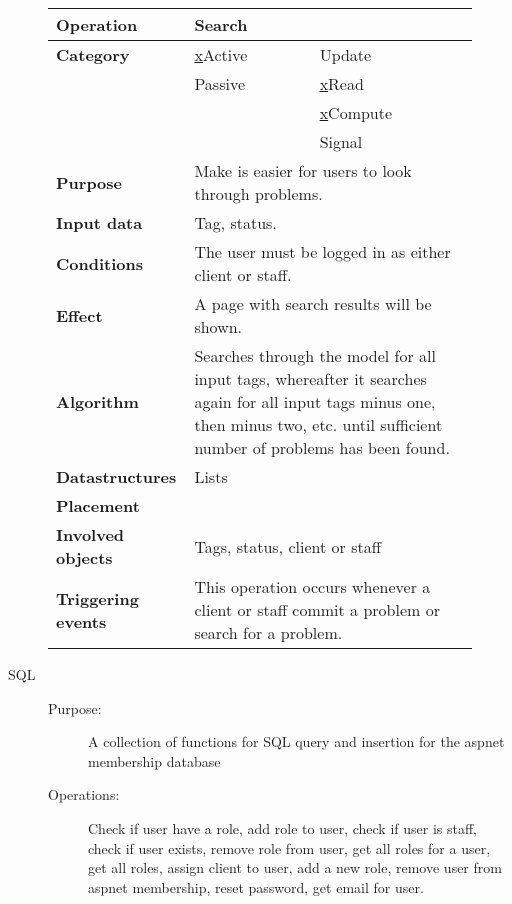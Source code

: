 \begin{figure}
\begin{tabular}{p{3.5cm} p{4cm} p{4cm}}
\hline
\textbf{Operation}&Search\\
\hline
\textbf{Category}&\underline{x}Active&\underline{ }Update\\
&\underline{ }Passive&\underline{x}Read\\
&&\underline{x}Compute\\
&&\underline{ }Signal\\
\textbf{Purpose}&\multicolumn{2}{p{8cm}}{Make is easier for users to look through problems.}\\
\textbf{Input data}&\multicolumn{2}{p{8cm}}{Tag, status.}\\
\textbf{Conditions}&\multicolumn{2}{p{8cm}}{The user must be logged in as either client or staff.}\\
\textbf{Effect}&\multicolumn{2}{p{8cm}}{A page with search results will be shown.}\\
\textbf{Algorithm}&\multicolumn{2}{p{8cm}}{Searches through the model for all input tags, whereafter it searches again for all input tags minus one, then minus two, etc. until sufficient number of problems has been found.}\\
\textbf{Datastructures}&\multicolumn{2}{p{8cm}}{Lists}\\
\textbf{Placement}&\multicolumn{2}{p{8cm}}{}\\
\textbf{Involved objects}&\multicolumn{2}{p{8cm}}{Tags, status, client or staff}\\
\textbf{Triggering events}&\multicolumn{2}{p{8cm}}{This operation occurs whenever a client or staff commit a problem or search for a problem.}\\
\hline
\end{tabular}
\label{fig:Search}
\end{figure}

\begin{description}
\item[SQL]\hfill
\begin{description}
\item[Purpose:]A collection of functions for SQL query and insertion for the aspnet membership database
\item[Operations:]Check if user have a role, add role to user, check if user is staff, check if user exists, remove role from user, get all roles for a user, get all roles, assign client to user, add a new role, remove user from aspnet membership, reset password, get email for user.
\end{description}
\end{description}

